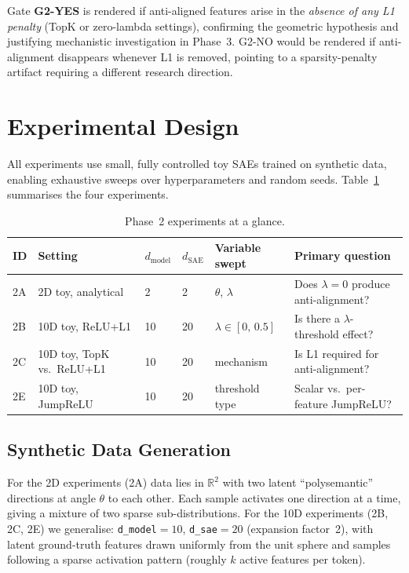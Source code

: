 \documentclass[11pt,a4paper]{article}
\begin{document}
Gate \textbf{G2-YES} is rendered if anti-aligned features arise in the \emph{absence of any
L1 penalty} (TopK or zero-lambda settings), confirming the geometric hypothesis and
justifying mechanistic investigation in Phase~3.  G2-NO would be rendered if anti-alignment
disappears whenever L1 is removed, pointing to a sparsity-penalty artifact requiring a
different research direction.

\section{Experimental Design}
\label{sec:design}

All experiments use small, fully controlled toy SAEs trained on synthetic data, enabling
exhaustive sweeps over hyperparameters and random seeds.  Table~\ref{tab:experiments}
summarises the four experiments.

\begin{table}[H]
\centering
\caption{Phase~2 experiments at a glance.}
\label{tab:experiments}
\begin{tabular}{@{}llllll@{}}
\toprule
ID & Setting & $d_{\mathrm{model}}$ & $d_{\mathrm{SAE}}$ & Variable swept & Primary question\\
\midrule
2A & 2D toy, analytical & 2 & 2 & $\theta$, $\lambda$ & Does $\lambda{=}0$ produce anti-alignment?\\
2B & 10D toy, ReLU+L1  & 10 & 20 & $\lambda \in [0,\,0.5]$ & Is there a $\lambda$-threshold effect?\\
2C & 10D toy, TopK vs.\ ReLU+L1 & 10 & 20 & mechanism & Is L1 required for anti-alignment?\\
2E & 10D toy, JumpReLU & 10 & 20 & threshold type & Scalar vs.\ per-feature JumpReLU?\\
\bottomrule
\end{tabular}
\end{table}

\subsection{Synthetic Data Generation}

For the 2D experiments (2A) data lies in $\mathbb{R}^2$ with two latent ``polysemantic''
directions at angle $\theta$ to each other.  Each sample activates one direction at a time,
giving a mixture of two sparse sub-distributions.  For the 10D experiments (2B, 2C, 2E)
we generalise: \texttt{d\_model}$=10$, \texttt{d\_sae}$=20$ (expansion factor~2), with
latent ground-truth features drawn uniformly from the unit sphere and samples following
a sparse activation pattern (roughly $k$ active features per token).
\end{document}
